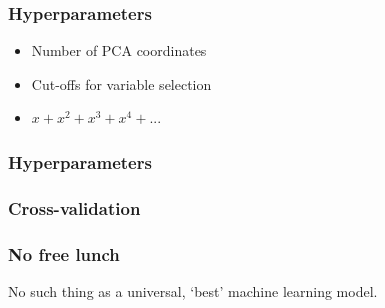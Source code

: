 \documentclass[handout, aspectratio = 169]{beamer}
\begin{document}
\begin{frame}
\frametitle{Hyperparameters}
\begin{itemize}
\item Number of PCA coordinates
\item Cut-offs for variable selection
\item $x + x^2 + x^3 + x^4 + ...$
\end{itemize}
\end{frame} 

\begin{frame}
\frametitle{Hyperparameters}
\begin{figure}
\end{figure} 
\end{frame} 



\begin{frame}
\frametitle{Cross-validation}
\begin{figure}
\end{figure} 
\end{frame} 












\begin{frame}
\frametitle{No free lunch}
No such thing as a universal, `best' machine learning model.
\end{frame} 
\end{document}

